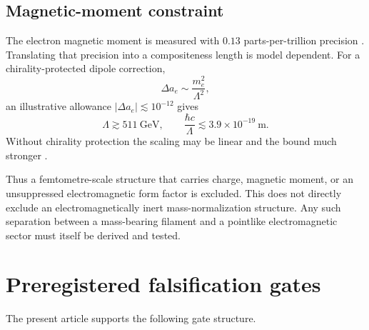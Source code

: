 \documentclass[aps,pre,preprint,notitlepage,nofootinbib,superscriptaddress]{revtex4-2}
\begin{document}
\subsection{Magnetic-moment constraint}

The electron magnetic moment is measured with \(0.13\) parts-per-trillion precision \cite{Fan2023}.  Translating that precision into a compositeness length is model dependent.  For a chirality-protected dipole correction,
\begin{equation}
  \Delta a_e
  \sim
  \frac{m_e^2}{\Lambda^2},
\end{equation}
an illustrative allowance \(|\Delta a_e|\lesssim10^{-12}\) gives
\begin{equation}
  \Lambda\gtrsim511\ \mathrm{GeV},
  \qquad
  \frac{\hbar c}{\Lambda}
  \lesssim3.9\times10^{-19}\ \mathrm m.
  \label{eq:gminus2-bound}
\end{equation}
Without chirality protection the scaling may be linear and the bound much stronger \cite{BrodskyDrell1980,GiudiceParadisiPassera2012}.

Thus a femtometre-scale structure that carries charge, magnetic moment, or an unsuppressed electromagnetic form factor is excluded.  This does not directly exclude an electromagnetically inert mass-normalization structure.  Any such separation between a mass-bearing filament and a pointlike electromagnetic sector must itself be derived and tested.

\section{Preregistered falsification gates}
\label{sec:programme}

The present article supports the following gate structure.
\end{document}
